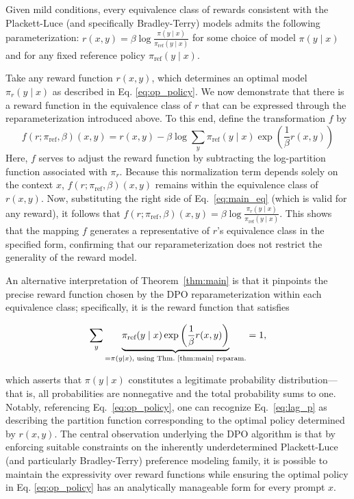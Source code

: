 \begin{theorem}\label{thm:main}
    Given mild conditions, every equivalence class of rewards consistent with the Plackett-Luce (and specifically Bradley-Terry) models admits the following parameterization: ${r(x, y) = \beta \log \frac{\pi(y\mid x)}{\pi_\text{ref}(y\mid x)}}$ for some choice of model $\pi(y\mid x)$ and for any fixed reference policy $\pi_\text{ref}(y \mid x)$.
\end{theorem}

\begin{sproof}
    Take any reward function $r(x, y)$, which determines an optimal model $\pi_r(y \mid x)$ as described in Eq. \ref{eq:op_policy}. We now demonstrate that there is a reward function in the equivalence class of $r$ that can be expressed through the reparameterization introduced above. To this end, define the transformation $f$ by  
\begin{equation}
    f(r; \pi_\text{ref}, \beta)(x, y) = r(x, y) - \beta\log\sum_{y}\pi_\text{ref}(y\mid x)\exp\left(\frac{1}{\beta}r(x, y)\right)
\end{equation}
Here, $f$ serves to adjust the reward function by subtracting the log-partition function associated with $\pi_r$. Because this normalization term depends solely on the context $x$, $f(r; \pi_\text{ref}, \beta)(x, y) $ remains within the equivalence class of $r(x, y)$. Now, substituting the right side of Eq.~\ref{eq:main_eq} (which is valid for any reward), it follows that $f(r; \pi_\text{ref}, \beta)(x, y) = \beta \log \frac{\pi_r(y\mid x)}{\pi_\text{ref}(y\mid x)}$. This shows that the mapping $f$ generates a representative of $r$'s equivalence class in the specified form, confirming that our reparameterization does not restrict the generality of the reward model.
\end{sproof}

An alternative interpretation of Theorem~\ref{thm:main} is that it pinpoints the precise reward function chosen by the DPO reparameterization within each equivalence class; specifically, it is the reward function that satisfies

\begin{equation}\label{eq:lag_p}
     \sum_{y}\underbrace{\pi_\text{ref}(y\mid x)\exp\left(\frac{1}{\beta}r(x, y)\right)}_{=\pi(y\mid x)\text{, using Thm.~\ref{thm:main} reparam.}} = 1,
\end{equation}

which asserts that $\pi(y\mid x)$ constitutes a legitimate probability distribution—that is, all probabilities are nonnegative and the total probability sums to one. Notably, referencing Eq.~\ref{eq:op_policy}, one can recognize Eq.~\ref{eq:lag_p} as describing the partition function corresponding to the optimal policy determined by $r(x, y)$. The central observation underlying the DPO algorithm is that by enforcing suitable constraints on the inherently underdetermined Plackett-Luce (and particularly Bradley-Terry) preference modeling family, it is possible to maintain the expressivity over reward functions while ensuring the optimal policy in Eq. \ref{eq:op_policy} has an analytically manageable form for every prompt $x$.


